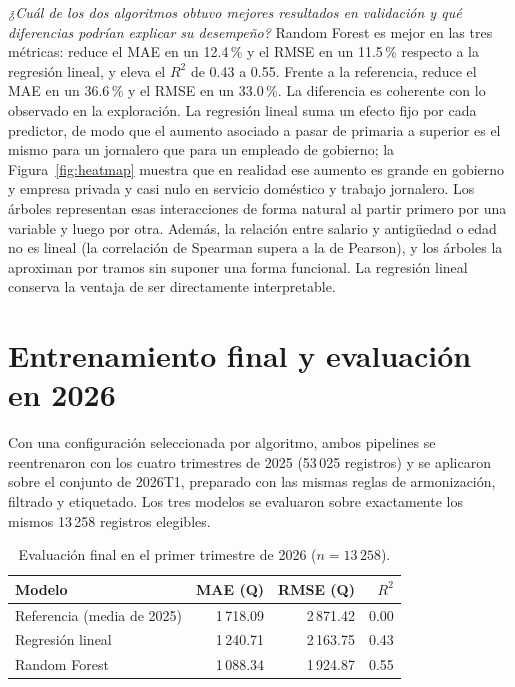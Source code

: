 \documentclass[11pt,a4paper]{article}
\begin{document}
\textit{¿Cuál de los dos algoritmos obtuvo mejores resultados en validación y qué diferencias podrían explicar su desempeño?} Random Forest es mejor en las tres métricas: reduce el MAE en un 12.4\,\% y el RMSE en un 11.5\,\% respecto a la regresión lineal, y eleva el $R^2$ de 0.43 a 0.55. Frente a la referencia, reduce el MAE en un 36.6\,\% y el RMSE en un 33.0\,\%. La diferencia es coherente con lo observado en la exploración. La regresión lineal suma un efecto fijo por cada predictor, de modo que el aumento asociado a pasar de primaria a superior es el mismo para un jornalero que para un empleado de gobierno; la Figura~\ref{fig:heatmap} muestra que en realidad ese aumento es grande en gobierno y empresa privada y casi nulo en servicio doméstico y trabajo jornalero. Los árboles representan esas interacciones de forma natural al partir primero por una variable y luego por otra. Además, la relación entre salario y antigüedad o edad no es lineal (la correlación de Spearman supera a la de Pearson), y los árboles la aproximan por tramos sin suponer una forma funcional. La regresión lineal conserva la ventaja de ser directamente interpretable.

\section{Entrenamiento final y evaluación en 2026}

Con una configuración seleccionada por algoritmo, ambos pipelines se reentrenaron con los cuatro trimestres de 2025 (53\,025 registros) y se aplicaron sobre el conjunto de 2026T1, preparado con las mismas reglas de armonización, filtrado y etiquetado. Los tres modelos se evaluaron sobre exactamente los mismos 13\,258 registros elegibles.

\begin{table}[H]
\centering
\caption{Evaluación final en el primer trimestre de 2026 ($n = 13\,258$).}
\label{tab:test}
\small
\begin{tabular}{lrrr}
\toprule
Modelo & MAE (Q) & RMSE (Q) & $R^2$ \\
\midrule
Referencia (media de 2025) & 1\,718.09 & 2\,871.42 & 0.00 \\
Regresión lineal & 1\,240.71 & 2\,163.75 & 0.43 \\
Random Forest & 1\,088.34 & 1\,924.87 & 0.55 \\
\bottomrule
\end{tabular}
\end{table}
\end{document}
